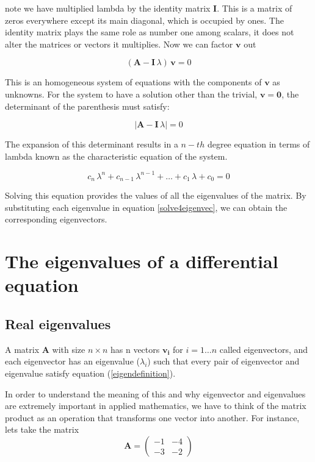 \documentclass{tufte-book} %
\begin{document}
note we have multiplied lambda by the identity matrix $\mathbf{I}$. This is a matrix of zeros everywhere except its main diagonal, which is occupied by ones. The identity matrix plays the same role as number one among scalars, it does not alter the matrices or vectors it multiplies. Now we can factor $\mathbf{v}$ out 

\begin{equation}
	\label{solve4eigenvec}
	\left( \mathbf{A}   - \mathbf{I} \, \lambda     \right) \, \mathbf{v} =  0  
\end{equation}

This is an homogeneous system of equations with the components of $\mathbf{v}$ as unknowns. For the system to have a solution other than the trivial, $\mathbf{v}=\mathbf{0}$, the determinant of the parenthesis must satisfy:

\begin{equation}
	\label{solve4eigenval}
	\left| \mathbf{A}   - \mathbf{I} \, \lambda     \right|  =  0  
\end{equation}

The expansion of this determinant results in a $n-th$ degree equation in terms of lambda known as the characteristic equation of the system.

\begin{equation}
c_n \, \lambda^n +c_{n-1} \, \lambda^{n-1}  + \dots  + c_1 \, \lambda + c_0 = 0 \nonumber
\end{equation}

Solving this equation provides the values of all the eigenvalues of the matrix. By substituting each eigenvalue in equation \ref{solve4eigenvec}, we can obtain the corresponding eigenvectors.

\section{The eigenvalues of a differential equation} 

\subsection{Real eigenvalues}
A matrix $\mathbf{A}$ with size $n \times n$ has n vectors $\mathbf{v_i}$ for $i = 1 \dots n$ called eigenvectors, and each eigenvector has an eigenvalue ($\lambda_i$) such that every pair of eigenvector and eigenvalue satisfy equation (\ref{eigendefinition}).
	
In order to understand the meaning of this and why eigenvector and eigenvalues are extremely important in applied mathematics, we have to think of the matrix product as an operation that transforms one vector into another. For instance, lets take the matrix
\begin{equation}
	\mathbf{A}  = \begin{pmatrix} -1 & -4\\ -3 & -2\end{pmatrix} \nonumber
\end{equation}
\end{document}
